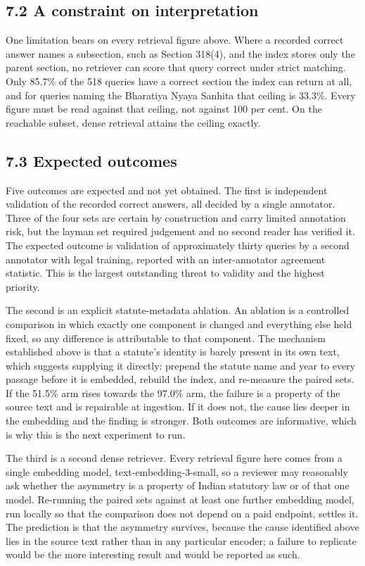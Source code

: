 \documentclass[12pt,a4paper]{article}
\begin{document}
\subsection*{7.2 A constraint on interpretation}
One limitation bears on every retrieval figure above. Where a recorded correct answer names a subsection, such as Section 318(4), and the index stores only the parent section, no retriever can score that query correct under strict matching. Only 85.7\% of the 518 queries have a correct section the index can return at all, and for queries naming the Bharatiya Nyaya Sanhita that ceiling is 33.3\%. Every figure must be read against that ceiling, not against 100 per cent. On the reachable subset, dense retrieval attains the ceiling exactly.

\subsection*{7.3 Expected outcomes}
Five outcomes are expected and not yet obtained. The first is independent validation of the recorded correct answers, all decided by a single annotator. Three of the four sets are certain by construction and carry limited annotation risk, but the layman set required judgement and no second reader has verified it. The expected outcome is validation of approximately thirty queries by a second annotator with legal training, reported with an inter-annotator agreement statistic. This is the largest outstanding threat to validity and the highest priority.

The second is an explicit statute-metadata ablation. An ablation is a controlled comparison in which exactly one component is changed and everything else held fixed, so any difference is attributable to that component. The mechanism established above is that a statute's identity is barely present in its own text, which suggests supplying it directly: prepend the statute name and year to every passage before it is embedded, rebuild the index, and re-measure the paired sets. If the 51.5\% arm rises towards the 97.0\% arm, the failure is a property of the source text and is repairable at ingestion. If it does not, the cause lies deeper in the embedding and the finding is stronger. Both outcomes are informative, which is why this is the next experiment to run.

The third is a second dense retriever. Every retrieval figure here comes from a single embedding model, text-embedding-3-small, so a reviewer may reasonably ask whether the asymmetry is a property of Indian statutory law or of that one model. Re-running the paired sets against at least one further embedding model, run locally so that the comparison does not depend on a paid endpoint, settles it. The prediction is that the asymmetry survives, because the cause identified above lies in the source text rather than in any particular encoder; a failure to replicate would be the more interesting result and would be reported as such.
\end{document}
